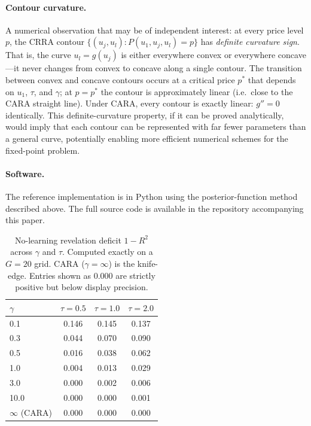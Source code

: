 \documentclass[12pt,letterpaper]{article}
\theoremstyle{definition}
\theoremstyle{remark}
\newcommand{\1}{\mathbf{1}}
\begin{document}
\paragraph{Contour curvature.}
A numerical observation that may be of independent interest: at every
price level $p$, the CRRA contour $\{(u_j,u_l):P(u_1,u_j,u_l)=p\}$
has \emph{definite curvature sign}.  That is, the curve $u_l=g(u_j)$
is either everywhere convex or everywhere concave---it never changes
from convex to concave along a single contour.  The transition between
convex and concave contours occurs at a critical price $p^{*}$ that
depends on $u_1$, $\tau$, and $\gamma$; at $p=p^{*}$ the contour is
approximately linear (i.e.\ close to the CARA straight line).  Under
CARA, every contour is exactly linear: $g''=0$ identically.  This
definite-curvature property, if it can be proved analytically, would
imply that each contour can be represented with far fewer parameters
than a general curve, potentially enabling more efficient numerical
schemes for the fixed-point problem.

\paragraph{Software.} The reference implementation is in Python using the
posterior-function method described above. The full source code is
available in the repository accompanying this paper.

\begin{table}[htbp]
\centering
\caption{No-learning revelation deficit $1-R^{2}$ across $\gamma$ and
$\tau$. Computed exactly on a $G=20$ grid. CARA ($\gamma=\infty$) is the
knife-edge. Entries shown as $0.000$ are strictly positive but below
display precision.}
\label{tab:smooth}
\begin{tabular}{lccc}
   \toprule
   $\gamma$ & $\tau=0.5$ & $\tau=1.0$ & $\tau=2.0$ \\
   \midrule
    0.1   & 0.146 & 0.145 & 0.137 \\
    0.3   & 0.044 & 0.070 & 0.090 \\
    0.5   & 0.016 & 0.038 & 0.062 \\
    1.0   & 0.004 & 0.013 & 0.029 \\
    3.0   & 0.000 & 0.002 & 0.006 \\
   10.0   & 0.000 & 0.000 & 0.001 \\
   $\infty$ (CARA) & 0.000 & 0.000 & 0.000 \\
   \bottomrule
\end{tabular}
\end{table}
\end{document}
